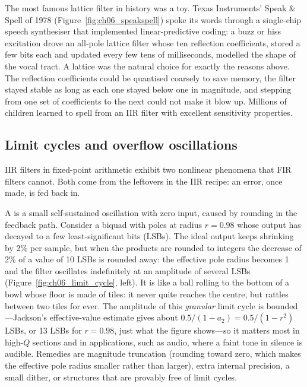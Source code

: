 
\begin{inpractice}
The most famous lattice filter in history was a toy. Texas Instruments' Speak \& Spell of 1978
(Figure~\ref{fig:ch06_speakspell}) spoke its words through a single-chip speech synthesiser that
implemented linear-predictive coding: a buzz or hiss excitation drove an all-pole lattice filter
whose ten reflection coefficients, stored a few bits each and updated every few tens of
milliseconds, modelled the shape of the vocal tract. A lattice was the natural choice for exactly
the reasons above. The reflection coefficients could be quantised coarsely to save memory, the
filter stayed stable as long as each one stayed below one in magnitude, and stepping from one set of
coefficients to the next could not make it blow up. Millions of children learned to spell from an
IIR filter with excellent sensitivity properties.
\end{inpractice}

\subsection{Limit cycles and overflow oscillations}

IIR filters in fixed-point arithmetic exhibit two nonlinear phenomena that FIR filters cannot.
Both come from the leftovers in the IIR recipe: an error, once made, is fed back in.

A  is a small self-sustained oscillation with zero input, caused by rounding
in the feedback path. Consider a biquad with poles at radius $r=0.98$ whose output has decayed to a
few least-significant bits (LSBs). The ideal output keeps shrinking by 2\% per sample, but when the
products are rounded to integers the decrease of 2\% of a value of 10 LSBs is rounded away: the
effective pole radius becomes 1 and the filter oscillates indefinitely at an amplitude of several
LSBs (Figure~\ref{fig:ch06_limit_cycle}, left). It is like a ball rolling to the bottom of a bowl
whose floor is made of tiles: it never quite reaches the centre, but rattles between two tiles for
ever. The amplitude of this \emph{granular} limit cycle is bounded---Jackson's effective-value
estimate gives about $0.5/(1-a_2)=0.5/(1-r^2)$ LSBs, or 13 LSBs for $r=0.98$, just what the figure
shows---so it matters most in high-$Q$ sections and in applications, such as audio, where a faint
tone in silence is audible. Remedies are magnitude truncation (rounding toward zero, which makes the
effective pole radius smaller rather than larger), extra internal precision, a small dither, or
structures that are provably free of limit cycles.

